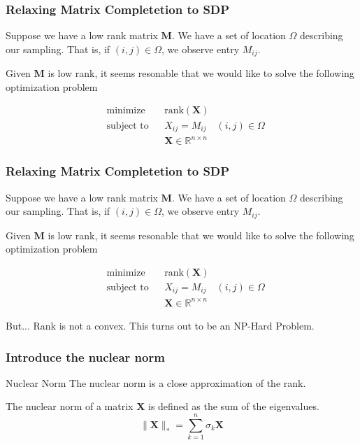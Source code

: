 \documentclass[
	11pt, %
]{beamer}
\begin{document}
\begin{frame}
	\frametitle{Relaxing Matrix Completetion to SDP}
	\vspace{-2.6em}
	Suppose we have a low rank matrix $\mathbf{M}$. We have a set of location $\Omega$ describing
	our sampling. That is, if $(i,j) \in \Omega$, we observe entry $M_{ij}$. 
	
	Given $\mathbf{M}$ is low rank, 
	it seems resonable that we would like to solve the following optimization problem
	
	\begin{equation*}
	  \begin{aligned}
	  & {\text{minimize}}
	  & & \text{rank}(\mathbf{X}) \\[1pt]
	  & \text{subject to}
	  & & X_{ij} = M_{ij} \quad (i,j) \in \Omega\\[1pt]
	  &&& \mathbf{X} \in \mathbb{R}^{n \times n}
	  \end{aligned}
	\end{equation*}

\end{frame}

\begin{frame}
	\frametitle{Relaxing Matrix Completetion to SDP}
	Suppose we have a low rank matrix $\mathbf{M}$. We have a set of location $\Omega$ describing
	our sampling. That is, if $(i,j) \in \Omega$, we observe entry $M_{ij}$. 
	
	Given $\mathbf{M}$ is low rank, 
	it seems resonable that we would like to solve the following optimization problem
	
	\begin{equation*}
	  \begin{aligned}
	  & {\text{minimize}}
	  & & \text{rank}(\mathbf{X}) \\[1pt]
	  & \text{subject to}
	  & & X_{ij} = M_{ij} \quad (i,j) \in \Omega\\[1pt]
	  &&& \mathbf{X} \in \mathbb{R}^{n \times n}
	  \end{aligned}
	\end{equation*}

	\begin{alertblock}{But...}
		Rank is not a convex. This turns out to be an NP-Hard Problem.
	\end{alertblock}
\end{frame}


\begin{frame}
	\frametitle{Introduce the nuclear norm}
	\vspace{-5.5em}
	\begin{block}{Nuclear Norm}
		The nuclear norm is a close approximation of the rank.
	\end{block}
	\vspace{2em}
	
	The nuclear norm of a matrix $\mathbf{X}$ is defined as the sum of 
	the eigenvalues.
	\[
	\lVert \mathbf{X} \rVert_* = \sum_{k=1}^n \sigma_k {\mathbf{X}}  
	\]
\end{frame}
\end{document}
